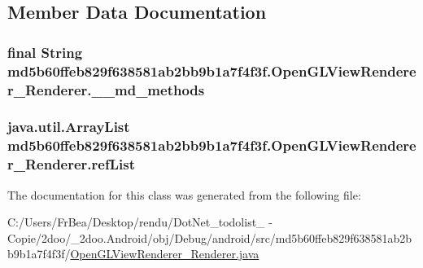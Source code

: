 \subsection{Member Data Documentation}
\hypertarget{classmd5b60ffeb829f638581ab2bb9b1a7f4f3f_1_1_open_g_l_view_renderer___renderer_571e71003f6b143de8e407be41c7b3d3}{
\subsubsection[{\_\-\_\-md\_\-methods}]{\setlength{\rightskip}{0pt plus 5cm}final String {\bf md5b60ffeb829f638581ab2bb9b1a7f4f3f.OpenGLViewRenderer\_\-Renderer.\_\-\_\-md\_\-methods}}}
\label{classmd5b60ffeb829f638581ab2bb9b1a7f4f3f_1_1_open_g_l_view_renderer___renderer_571e71003f6b143de8e407be41c7b3d3}


\hypertarget{classmd5b60ffeb829f638581ab2bb9b1a7f4f3f_1_1_open_g_l_view_renderer___renderer_f3d20851f4298900dc6d33f721cb582e}{
\subsubsection[{refList}]{\setlength{\rightskip}{0pt plus 5cm}java.util.ArrayList {\bf md5b60ffeb829f638581ab2bb9b1a7f4f3f.OpenGLViewRenderer\_\-Renderer.refList}}}
\label{classmd5b60ffeb829f638581ab2bb9b1a7f4f3f_1_1_open_g_l_view_renderer___renderer_f3d20851f4298900dc6d33f721cb582e}




The documentation for this class was generated from the following file:\begin{CompactItemize}
\item 
C:/Users/FrBea/Desktop/rendu/DotNet\_\-todolist\_ - Copie/2doo/\_\-2doo.Android/obj/Debug/android/src/md5b60ffeb829f638581ab2bb9b1a7f4f3f/\hyperlink{_open_g_l_view_renderer___renderer_8java}{OpenGLViewRenderer\_\-Renderer.java}\end{CompactItemize}
